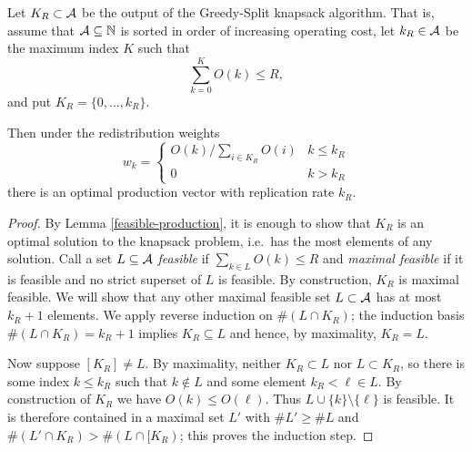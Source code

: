 \begin{proposition}\label{thm:optimal-production-vector}

  Let $K_R\subset\mathcal{A}$ be the output of the Greedy-Split knapsack algorithm.
  That is, assume that $\mathcal{A}\subseteq\mathbb{N}$ is sorted in order of increasing operating cost, let $k_R\in\mathcal{A}$ be the maximum index $K$ such that
  \[
    \sum_{k=0}^KO(k) \leq R,
  \]
  and put $K_R=\{0,\ldots,k_R\}$.

  Then under the redistribution weights
  \[
    w_k = \left\{ \begin{array}{ll}
      O(k)/\sum_{i\in K_R}O(i) & k\leq k_R \\
      0 & k > k_R
    \end{array} \right.
  \]
  there is an optimal production vector with replication rate $k_R$.

\end{proposition}
%
\begin{proof}

  By Lemma \ref{feasible-production}, it is enough to show that $K_R$ is an optimal solution to the knapsack problem, i.e.~has the most elements of any solution.
  Call a set $L\subseteq\mathcal{A}$ \emph{feasible} if $\sum_{k\in L}O(k)\leq R$ and \emph{maximal feasible} if it is feasible and no strict superset of $L$ is feasible.
  By construction, $K_R$ is maximal feasible.
  We will show that any other maximal feasible set $L\subset\mathcal{A}$ has at most $k_R+1$ elements. 
  We apply reverse induction on $\#(L\cap K_R)$; the induction basis $\#(L\cap K_R) = k_R+1$ implies $K_R\subseteq L$ and hence, by maximality, $K_R=L$. 
  
  Now suppose $[K_R]\neq L$.
  By maximality, neither $K_R\subset L$ nor $L\subset K_R$, so there is some index $k\leq k_R$ such that $k\not\in L$ and some element $k_R<\ell\in L$.
  By construction of $K_R$ we have $O(k)\leq O(\ell)$.
  Thus $L\cup\{k\}\setminus\{\ell\}$ is feasible.
  It is therefore contained in a maximal set $L'$ with $\#L'\geq\#L$ and $\#(L'\cap K_R) > \#(L\cap[ K_R)$; this proves the induction step. 
  \qedhere


\end{proof}

